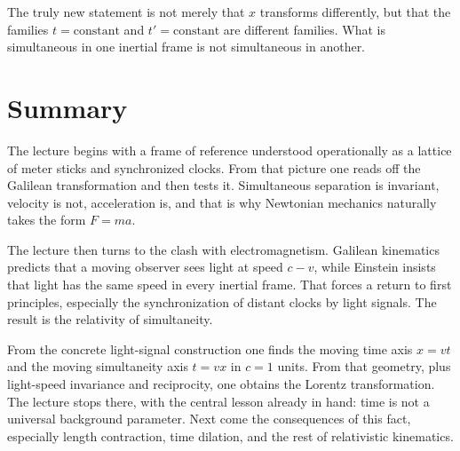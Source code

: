 The truly new statement is not merely that \(x\) transforms differently, but that the families \(t=\text{constant}\) and \(t'=\text{constant}\) are different families. What is simultaneous in one inertial frame is not simultaneous in another.

\section{Summary}

The lecture begins with a frame of reference understood operationally as a lattice of meter sticks and synchronized clocks. From that picture one reads off the Galilean transformation and then tests it. Simultaneous separation is invariant, velocity is not, acceleration is, and that is why Newtonian mechanics naturally takes the form \(F=ma\).

The lecture then turns to the clash with electromagnetism. Galilean kinematics predicts that a moving observer sees light at speed \(c-v\), while Einstein insists that light has the same speed in every inertial frame. That forces a return to first principles, especially the synchronization of distant clocks by light signals. The result is the relativity of simultaneity.

From the concrete light-signal construction one finds the moving time axis \(x=vt\) and the moving simultaneity axis \(t=vx\) in \(c=1\) units. From that geometry, plus light-speed invariance and reciprocity, one obtains the Lorentz transformation. The lecture stops there, with the central lesson already in hand: time is not a universal background parameter. Next come the consequences of this fact, especially length contraction, time dilation, and the rest of relativistic kinematics.